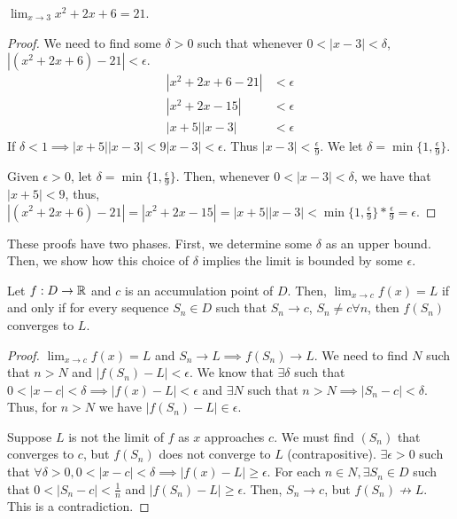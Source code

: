 \begin{theorem}
    $\lim_{x \to 3} x^2 + 2x + 6 = 21$.
\end{theorem}
\begin{proof}
    We need to find some $\delta > 0$ such that whenever $0 < |x - 3| < \delta$, $|(x^2 + 2x + 6) - 21| < \epsilon$.
    \begin{align*}
        |x^2 + 2x + 6 - 21| &< \epsilon \\
        |x^2 + 2x - 15| &< \epsilon \\
        |x + 5||x - 3| &< \epsilon
    \end{align*}
    If $\delta < 1 \implies |x + 5||x - 3| < 9|x - 3| < \epsilon$. Thus $|x - 3| < \frac{\epsilon}{9}$. We let $\delta = \min\{1, \frac{\epsilon}{9}\}$.

    Given $\epsilon > 0$, let $\delta = \min\{1, \frac{\epsilon}{9}\}$. Then, whenever $0 < |x - 3| < \delta$, we have that $|x + 5| < 9$, thus, $|(x^2 + 2x + 6) - 21| = |x^2 + 2x - 15| = |x + 5||x - 3| < \min\{1, \frac{\epsilon}{9}\} * \frac{\epsilon}{9} = \epsilon$.
\end{proof}
\begin{remark}
    These proofs have two phases. First, we determine some $\delta$ as an upper bound. Then, we show how this choice of $\delta$ implies the limit is bounded by some $\epsilon$.
\end{remark}

\begin{theorem}
    Let $f:D \to \mathbb{R}$ and $c$ is an accumulation point of $D$. Then, $\lim_{x \to c} f(x) = L$ if and only if for every sequence $S_n \in D$ such that $S_n \to c$, $S_n \neq c \forall n$, then $f(S_n)$ converges to $L$.
\end{theorem}
\begin{proof}
    $\lim_{x \to c} f(x) = L$ and $S_n \to L \implies f(S_n) \to L$. We need to find $N$ such that $n > N$ and $|f(S_n) - L| < \epsilon$. We know that $\exists \delta$ such that $0 < |x - c| < \delta \implies |f(x) - L| < \epsilon$ and $\exists N$ such that $n > N \implies |S_n - c| < \delta$. Thus, for $n > N$ we have $|f(S_n) - L| \in \epsilon$.

    Suppose $L$ is not the limit of $f$ as $x$ approaches $c$. We must find $(S_n)$ that converges to $c$, but $f(S_n)$ does not converge to $L$ (contrapositive). $\exists \epsilon > 0$ such that $\forall \delta > 0, 0 < |x - c| < \delta \implies |f(x) - L| \geq \epsilon$. For each $n \in N, \exists S_n \in D$ such that $0 < |S_n - c| < \frac{1}{n}$ and $|f(S_n) - L| \geq \epsilon$. Then, $S_n \to c$, but $f(S_n) \not\to L$. This is a contradiction.
\end{proof}